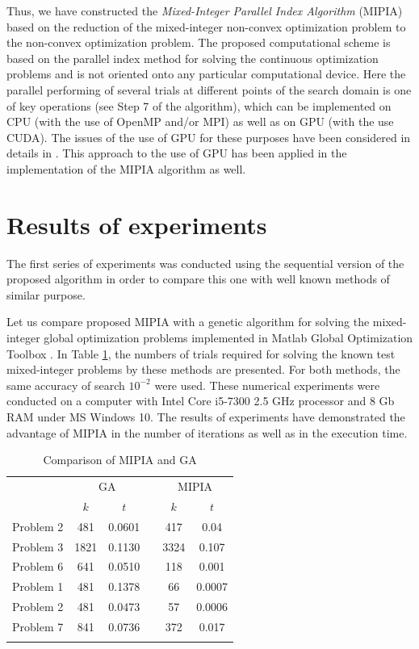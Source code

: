 \documentclass[runningheads]{llncs}
\begin{document}
Thus, we have constructed the \textit{Mixed-Integer Parallel Index Algorithm} \break
(MIPIA) based on the  reduction of the mixed-integer non-convex optimization problem to the non-convex optimization problem.
The proposed computational scheme is based on the parallel index method for solving the
continuous optimization problems and is not oriented onto any particular computational device.
Here the parallel performing of several trials at different points of the search domain is one of
key operations (see Step 7 of the algorithm), which can be implemented on CPU (with the use
of OpenMP and/or MPI) as well as on GPU (with the use CUDA). The issues of the use of
GPU for these purposes have been considered in details in
\cite{Barkalov2016,Gergel2016}. This approach to the use of GPU has been applied in
the implementation of the MIPIA algorithm as well.


\section{Results of experiments}
The first series of experiments was conducted using the sequential version of the proposed
algorithm in order to compare this one with well known methods of similar purpose.

Let us compare proposed MIPIA with a genetic algorithm for solving the mixed-integer global
optimization problems implemented in Matlab Global Optimization Toolbox \cite{Matlab}. In
Table \ref{tab:1}, the numbers of trials required for solving the known test mixed-integer
problems by these methods are presented. For both methods, the same accuracy of search
$10^{-2}$ were used. These numerical experiments were conducted on a
computer with Intel Core i5-7300 2.5 GHz processor and 8 Gb RAM under MS Windows 10.
The results of experiments have demonstrated the advantage of MIPIA in the number
of iterations as well as in the execution time.

\begin{table}
	\caption{Comparison of MIPIA and GA}
	\label{tab:1}
	\center
	\begin{tabular}{cccccc}
		\hline\noalign{\smallskip}
	\multirow{2}{*}{Test problem}	 & \multicolumn{2}{c}{ GA } & &
\multicolumn{2}{c}{MIPIA} \\
		\noalign{\smallskip} \cline{2-3} \cline{5-6} \noalign{\smallskip}
		 & $k$ & $t$ & & $k$ & $t$  \\
		\noalign{\smallskip} \hline \noalign{\smallskip}
		 Problem 2 \cite{Floudas}&	481 &	0.0601 & &	417 &	0.04 \\
		 Problem 3 \cite{Floudas}& 	1821 &	0.1130 & & 3324 &	0.107 \\
		 Problem 6 \cite{Floudas}&	641 &	0.0510 & &	118 &	0.001 \\
		 Problem 1 \cite{Deep}   &	481 &	0.1378 & &	66 &	0.0007 \\
		 Problem 2 \cite{Deep}   &	481 &	0.0473 & &	57 &	0.0006 \\
		 Problem 7 \cite{Deep}   &	841 &	0.0736 & & 372	 &	0.017 \\
		\noalign{\smallskip}\hline
	\end{tabular}
\end{table}
\end{document}
